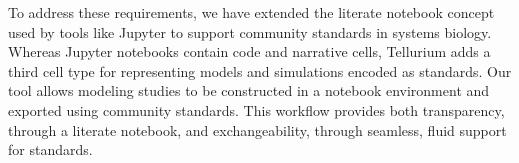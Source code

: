 \documentclass[10pt,letterpaper]{article}
\begin{document}
To address these requirements, we have extended the literate notebook concept used by tools like Jupyter \cite{ragan2014jupyter} to support community standards in systems biology. Whereas Jupyter notebooks contain code and narrative cells, Tellurium adds a third cell type for representing models and simulations encoded as standards. Our tool allows modeling studies to be constructed in a notebook environment and exported using community standards. This workflow %
provides both transparency, through a literate notebook, and exchangeability, through seamless, fluid support for standards. %


\end{document}
